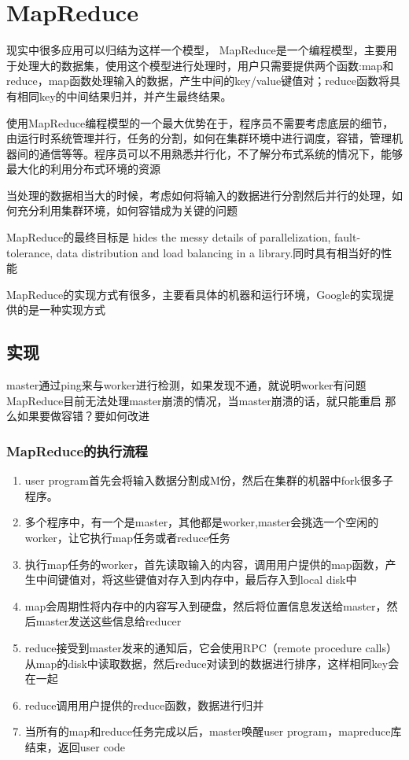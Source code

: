 \section{MapReduce}
现实中很多应用可以归结为这样一个模型，
MapReduce是一个编程模型，主要用于处理大的数据集，使用这个模型进行处理时，用户只需要提供两个函数:map和reduce，map函数处理输入的数据，产生中间的key/value键值对；reduce函数将具有相同key的中间结果归并，并产生最终结果。

使用MapReduce编程模型的一个最大优势在于，程序员不需要考虑底层的细节，由运行时系统管理并行，任务的分割，如何在集群环境中进行调度，容错，管理机器间的通信等等。程序员可以不用熟悉并行化，不了解分布式系统的情况下，能够最大化的利用分布式环境的资源

当处理的数据相当大的时候，考虑如何将输入的数据进行分割然后并行的处理，如何充分利用集群环境，如何容错成为关键的问题

MapReduce的最终目标是
hides the messy details of parallelization, fault-tolerance, data distribution and load balancing in a library.同时具有相当好的性能

MapReduce的实现方式有很多，主要看具体的机器和运行环境，Google的实现提供的是一种实现方式

\subsection{实现}
master通过ping来与worker进行检测，如果发现不通，就说明worker有问题
MapReduce目前无法处理master崩溃的情况，当master崩溃的话，就只能重启
{\color{red}那么如果要做容错？要如何改进}
\subsubsection{MapReduce的执行流程}
\begin{enumerate}
  \item user program首先会将输入数据分割成M份，然后在集群的机器中fork很多子程序。
  \item 多个程序中，有一个是master，其他都是worker,master会挑选一个空闲的worker，让它执行map任务或者reduce任务
  \item 执行map任务的worker，首先读取输入的内容，调用用户提供的map函数，产生中间键值对，将这些键值对存入到内存中，最后存入到local disk中
  \item map会周期性将内存中的内容写入到硬盘，然后将位置信息发送给master，然后master发送这些信息给reducer
  \item reduce接受到master发来的通知后，它会使用RPC（remote procedure calls）从map的disk中读取数据，然后reduce对读到的数据进行排序，这样相同key会在一起
  \item reduce调用用户提供的reduce函数，数据进行归并
  \item 当所有的map和reduce任务完成以后，master唤醒user program，mapreduce库结束，返回user code
\end{enumerate}

